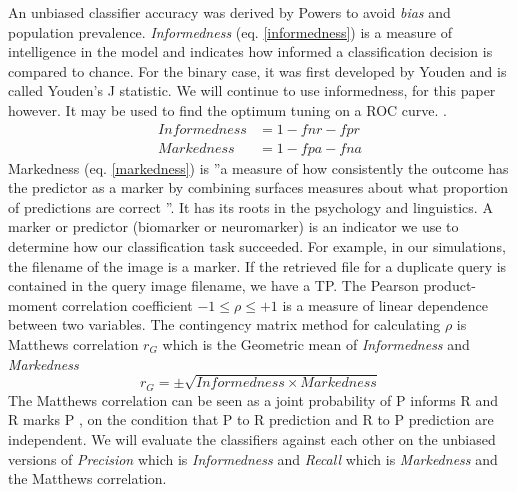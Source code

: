 \documentclass[english,12pt,a4paper,pdftex,elec,utf8, table]{aaltothesis}
\begin{document}
An unbiased classifier accuracy was derived by Powers \cite{Powers2003} to avoid \emph{bias} and population prevalence. \emph{Informedness} (eq. \ref{informedness}) is a measure of intelligence in the model and indicates how informed a classification decision is compared to chance. For the binary case, it was first developed by Youden and is called Youden's J statistic. We will continue to use informedness, for this paper however. It may be used to find the optimum tuning on a ROC curve. \cite{POWERS2011}.
\begin{align}
Informedness &= 1 - fnr - fpr\label{informedness}\\
Markedness &= 1 - fpa - fna\label{markedness}
\end{align}
Markedness (eq. \ref{markedness}) is ''a measure of how consistently the outcome has the predictor as a marker by combining surfaces measures about what proportion of predictions are correct \cite{POWERS2011}''.
It has its roots in the psychology and linguistics. A marker or predictor (biomarker or neuromarker) is an indicator we use to determine how our classification task succeeded. For example, in our simulations, the filename of the image is a marker. If the retrieved file for a duplicate query is contained in the query image filename, we have a TP. The Pearson product-moment correlation coefficient $-1 \leq \rho \leq +1$ is a measure of linear dependence between two variables. The contingency matrix method for calculating $\rho$ is Matthews correlation $r_G$ which is the Geometric mean of \emph{Informedness} and \emph{Markedness}
\begin{equation}\label{matthewscorrelation}
r_G = \pm \sqrt{Informedness \times Markedness}
\end{equation}
The Matthews correlation can be seen as a joint probability of P informs R and R marks P \cite{POWERS2011}, on the condition that P to R prediction and R to P prediction are independent.
We will evaluate the classifiers against each other on the unbiased versions of \emph{Precision} which is \emph{Informedness} and \emph{Recall} which is \emph{Markedness} and the Matthews correlation.
\end{document}
